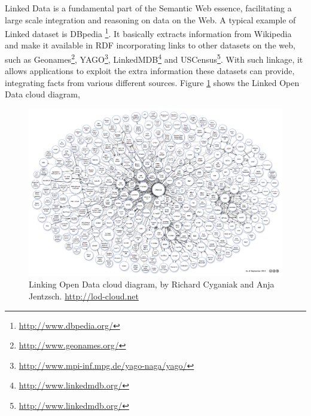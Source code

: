 Linked Data is a fundamental part of the Semantic Web essence, facilitating a large scale integration and reasoning
on data on the Web. A typical example of Linked dataset is DBpedia
{\footnote{\url{http://www.dbpedia.org/}}}. It basically extracts information from Wikipedia and
make it available in RDF incorporating links to other datasets on the web, such as 
Geonames\footnote{\url{http://www.geonames.org/}},
YAGO\footnote{\url{http://www.mpi-inf.mpg.de/yago-naga/yago/}}, 
LinkedMDB\footnote{\url{http://www.linkedmdb.org/}} and 
USCensus\footnote{\url{http://www.linkedmdb.org/}}. 
With such linkage, it allows
applications to exploit the extra information these datasets can provide, integrating facts from various different
sources. Figure \ref{fig:lod} shows the Linked Open Data cloud
diagram, 

\begin{figure}
\label{fig:lod}
\begin{center}
  \includegraphics[width=1\linewidth]{./Figures/lod-datasets_2011-09-19.png}
\end{center}
\caption{Linking Open Data cloud diagram, by Richard Cyganiak and Anja Jentzsch. \url{http://lod-cloud.net}}
\end{figure}
